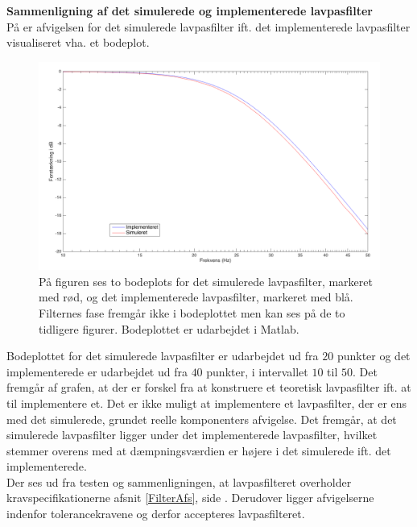 \noindent \textbf{Sammenligning af det simulerede og implementerede lavpasfilter} \\
På  er afvigelsen for det simulerede lavpasfilter ift. det implementerede lavpasfilter visualiseret vha. et bodeplot. 
\begin{figure}[H]
	\centering
	\includegraphics[scale=0.4]{figures/cProblemloesning/sammenligning_sim_imp.PNG}
	\caption{På figuren ses to bodeplots for det simulerede lavpasfilter, markeret med rød, og det implementerede lavpasfilter, markeret med blå. Filternes fase fremgår ikke i bodeplottet men kan ses på de to tidligere figurer. Bodeplottet er udarbejdet i Matlab.}
	\label{fig:sammenligning_sim_imp}
\end{figure} 
Bodeplottet for det simulerede lavpasfilter er udarbejdet ud fra $20$ punkter og det implementerede er udarbejdet ud fra $40$ punkter, i intervallet $10$ til $50$. Det fremgår af grafen, at der er forskel fra at konstruere et teoretisk lavpasfilter ift. at til implementere et. Det er ikke muligt at implementere et lavpasfilter, der er ens med det simulerede, grundet reelle komponenters afvigelse. Det fremgår, at det simulerede lavpasfilter ligger under det implementerede lavpasfilter, hvilket stemmer overens med at dæmpningsværdien er højere i det simulerede ift. det implementerede. \\
Der ses ud fra testen og sammenligningen, at lavpasfilteret overholder kravspecifikationerne afsnit \ref{FilterAfs}, side \pageref{FilterAfs}. Derudover ligger afvigelserne indenfor tolerancekravene og derfor accepteres lavpasfilteret. 